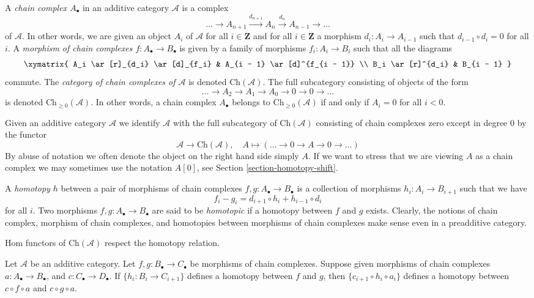 \medskip\noindent
A {\it chain complex $A_\bullet$} in an additive category $\mathcal{A}$
is a complex
$$
\ldots \to
A_{n + 1} \xrightarrow{d_{n + 1}}
A_n \xrightarrow{d_n}
A_{n - 1} \to
\ldots
$$
of $\mathcal{A}$. In other words, we are given an object $A_i$ of
$\mathcal{A}$ for all $i \in \mathbf{Z}$ and for
all $i \in \mathbf{Z}$ a morphism $d_i : A_i \to A_{i - 1}$ such that
$d_{i - 1} \circ d_i = 0$ for all $i$. A {\it morphism of chain
complexes $f : A_\bullet \to B_\bullet$} is given by a
family of morphisms $f_i : A_i \to B_i$ such that all
the diagrams
$$
\xymatrix{
A_i \ar[r]_{d_i} \ar[d]_{f_i} & A_{i - 1} \ar[d]^{f_{i - 1}} \\
B_i \ar[r]^{d_i} & B_{i - 1}
}
$$
commute. The {\it category of chain complexes of $\mathcal{A}$}
is denoted $\text{Ch}(\mathcal{A})$. The full subcategory consisting
of objects of the form
$$
\ldots \to A_2 \to A_1 \to A_0 \to 0 \to 0 \to \ldots
$$
is denoted $\text{Ch}_{\geq 0}(\mathcal{A})$.
In other words, a chain complex $A_\bullet$ belongs to
$\text{Ch}_{\geq 0}(\mathcal{A})$ if and only if
$A_i = 0$ for all $i < 0$.

\medskip\noindent
Given an additive category $\mathcal{A}$ we identify $\mathcal{A}$
with the full subcategory of $\text{Ch}(\mathcal{A})$ consisting
of chain complexes zero except in degree $0$ by the functor
$$
\mathcal{A} \longrightarrow \text{Ch}(\mathcal{A}),\quad
A \longmapsto (\ldots \to 0 \to A \to 0 \to \ldots)
$$
By abuse of notation we often denote the object on the right hand side
simply $A$. If we want to stress that we are viewing $A$ as a chain
complex we may sometimes use the notation $A[0]$, see
Section \ref{section-homotopy-shift}.

\medskip\noindent
A {\it homotopy $h$} between a pair of morphisms
of chain complexes $f, g : A_\bullet \to B_\bullet$
is a collection of morphisms $h_i : A_i \to B_{i + 1}$
such that we have
$$
f_i - g_i = d_{i + 1} \circ h_i + h_{i - 1} \circ d_i
$$
for all $i$.
Two morphisms $f, g : A_\bullet \to B_\bullet$ are
said to be {\it homotopic} if a homotopy between $f$
and $g$ exists.
Clearly, the notions of chain complex, morphism of
chain complexes, and homotopies between morphisms of chain complexes
make sense even in a preadditive category.

\begin{lemma}
\label{lemma-compose-homotopy}
\begin{slogan}
Hom functors of $\text{Ch}(\mathcal{A})$ respect the homotopy relation.
\end{slogan}
Let $\mathcal{A}$ be an additive category.
Let $f, g : B_\bullet \to C_\bullet$ be morphisms
of chain complexes. Suppose given morphisms of chain
complexes $a : A_\bullet \to B_\bullet$, and
$c : C_\bullet \to D_\bullet$.
If $\{h_i : B_i \to C_{i + 1}\}$ defines a homotopy
between $f$ and $g$, then $\{c_{i + 1} \circ h_i \circ a_i\}$
defines a homotopy between $c \circ f \circ a$ and
$c \circ g \circ a$.
\end{lemma}

